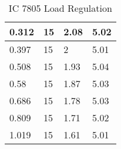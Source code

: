 \documentclass{scrartcl}
\newcommand{\1}{\mathbbm{1}}
\begin{document}
\begin{table}[!htb]
\begin{minipage}{.45\linewidth}
\begin{tabular}{|l|l|l|l|}
        0.312 & 15 & 2.08 & 5.02 \\ \hline
        0.397 & 15 & 2 & 5.01 \\ \hline
        0.508 & 15 & 1.93 & 5.04 \\ \hline
        0.58 & 15 & 1.87 & 5.03 \\ \hline
        0.686 & 15 & 1.78 & 5.03 \\ \hline
        0.809 & 15 & 1.71 & 5.02 \\ \hline
        1.019 & 15 & 1.61 & 5.01 \\ \hline
    \end{tabular}
    \caption{IC 7805 Load Regulation}
	\label{tab:icload}
    \end{minipage} 
\end{table}

\end{document}
